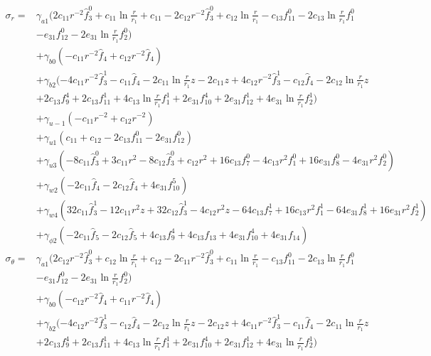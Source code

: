 \documentclass[12pt,sort&compress,fleqn,3p]{elsarticle}
\begin{document}
\begin{equation}
\begin{split}\label{labeq_stresses_01}
\sigma_{r} = &   \gamma_{a1} ( 2c_{11}r^{-2} \hat{f}^0_3  +  c_{11}\ln\frac{r}{r_1} + c_{11} -2c_{12}r^{-2}\hat{f}^0_3 + c_{12}\ln\frac{r}{r_1}    -c_{13}f^0_{11} -2c_{13}\ln\frac{r}{r_1} f^0_1  \\
&-e_{31}f^0_{12}  - 2e_{31}\ln\frac{r}{r_1}f^0_2  )\\
&  + \gamma_{b0} (  - c_{11}r^{-2}\hat{f}_4 + c_{12}r^{-2}\hat{f}_4)  \\
& + \gamma_{b2} ( -4c_{11}r^{-2}\hat{f}^1_3- c_{11}\hat{f}_4 -2c_{11}\ln\frac{r}{r_1}z -2c_{11}z + 4 c_{12}r^{-2}\hat{f}^1_3- c_{12}\hat{f}_4 -2c_{12}\ln\frac{r}{r_1}z\\
& +2 c_{13} f^4_9 + 2 c_{13} f^1_{11} + 4   c_{13}  \ln\frac{r}{r_1} f^1_1 + 2 e_{31}f^4_{10} + 2 e_{31}f^1_{12} + 4 e_{31}\ln\frac{r}{r_1}f^1_2   )\\
&+\gamma_{u-1}( -c_{11} r^{-2} + c_{12}r^{-2}) \\
& + \gamma_{u1}( c_{11} + c_{12}  - 2c_{13}f^0_{11}  - 2e_{31}f^0_{12} )\\
&+ \gamma_{u3}( -8c_{11}\hat{f}^0_3+  3c_{11}r^2 -8c_{12}\hat{f}^0_3 +  c_{12}r^2  + 16 c_{13}f^0_7 - 4c_{13}r^2f^0_1  +  16e_{31}f^0_{8} - 4e_{31}r^2f^0_2 )\\
&+ \gamma_{w2}( -2c_{11}\hat{f}_4 -2c_{12}\hat{f}_4 + 4e_{31}f^5_{10} ) \\
& + \gamma_{w4}(  32c_{11}\hat{f}^1_3 -12c_{11}r^2z +  32c_{12}\hat{f}^1_3 -4c_{12}r^2z   -64c_{13}f^1_7 + 16c_{13}r^2f^1_1 -64e_{31}f^1_{8} + 16e_{31}r^2f^1_2     )\\
&+  \gamma_{\phi2} (  -2c_{11}\hat{f}_5 -2c_{12}\hat{f}_5 +   4c_{13}f^4_{9}+ 4c_{13}f_{13}  +  4e_{31}f^4_{10} +4e_{31}f_{14} )    \\
\sigma_{\theta} = &   \gamma_{a1} ( 2c_{12}r^{-2} \hat{f}^0_3  +  c_{12}\ln\frac{r}{r_1} + c_{12} -2c_{11}r^{-2}\hat{f}^0_3 + c_{11}\ln\frac{r}{r_1}    -c_{13}f^0_{11} -2c_{13}\ln\frac{r}{r_1} f^0_1  \\
&-e_{31}f^0_{12}  - 2e_{31}\ln\frac{r}{r_1}f^0_2  )\\
&  + \gamma_{b0} (  - c_{12}r^{-2}\hat{f}_4 + c_{11}r^{-2}\hat{f}_4)  \\
& + \gamma_{b2} ( -4c_{12}r^{-2}\hat{f}^1_3- c_{12}\hat{f}_4 -2c_{12}\ln\frac{r}{r_1}z -2c_{12}z + 4 c_{11}r^{-2}\hat{f}^1_3- c_{11}\hat{f}_4 -2c_{11}\ln\frac{r}{r_1}z\\
& +2 c_{13} f^4_9 + 2 c_{13} f^1_{11} + 4   c_{13}  \ln\frac{r}{r_1} f^1_1 + 2 e_{31}f^4_{10} + 2 e_{31}f^1_{12} + 4 e_{31}\ln\frac{r}{r_1}f^1_2   )\\

\end{split}
\end{equation}
\end{document}
